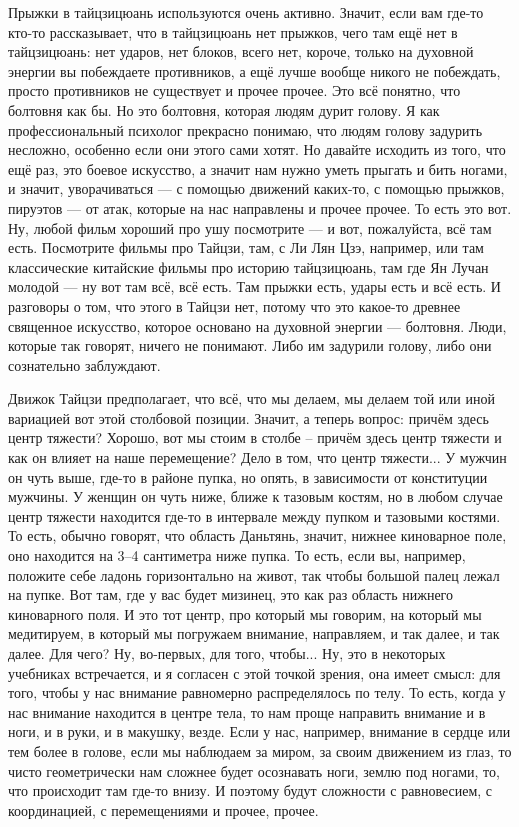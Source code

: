 Прыжки в тайцзицюань используются
очень активно. Значит, если вам где-то кто-то рассказывает, что в тайцзицюань нет прыжков, чего
там ещё нет в тайцзицюань: нет ударов, нет блоков, всего нет, короче, только на духовной
энергии вы побеждаете противников, а ещё лучше вообще никого не побеждать, просто противников
не существует и прочее прочее. Это всё понятно, что болтовня как бы. Но это болтовня, которая
людям дурит голову. Я как профессиональный психолог прекрасно понимаю, что людям голову
задурить несложно, особенно если они этого сами хотят. Но давайте исходить из того, что
ещё раз, это боевое искусство, а значит нам нужно уметь прыгать и бить ногами, и значит,
уворачиваться --- с помощью движений каких-то, с помощью прыжков, пируэтов --- от атак, которые на
нас направлены и прочее прочее. То есть это вот. Ну, любой фильм хороший про ушу посмотрите --- и
вот, пожалуйста, всё там есть. Посмотрите фильмы про Тайцзи, там, с Ли Лян Цзэ, например, или там
классические китайские фильмы про историю тайцзицюань, там где Ян
Лучан молодой --- ну вот там всё, всё есть. Там прыжки есть, удары есть и всё есть. И разговоры о
том, что этого в Тайцзи нет, потому что это какое-то древнее священное искусство, которое основано
на духовной энергии --- болтовня. Люди, которые так говорят, ничего не понимают. Либо им задурили
голову, либо они сознательно заблуждают.

Движок Тайцзи предполагает, что всё, что мы делаем, мы
делаем той или иной вариацией вот этой столбовой позиции. Значит, а теперь вопрос: причём здесь
центр тяжести? Хорошо, вот мы стоим в столбе -- причём здесь центр тяжести и как он влияет на
наше перемещение? Дело в том, что центр тяжести... У мужчин он чуть выше, где-то в районе пупка,
но опять, в зависимости от конституции мужчины. У женщин он чуть ниже, ближе к тазовым костям, но
в любом случае центр
тяжести находится где-то в интервале между пупком и тазовыми костями. То есть, обычно говорят,
что область Даньтянь, значит, нижнее киноварное поле, оно находится на 3--4 сантиметра ниже пупка.
То есть, если вы, например, положите себе ладонь горизонтально на живот, так чтобы большой палец
лежал на пупке. Вот там, где у вас будет мизинец, это как раз область нижнего киноварного поля.
И это
тот центр, про который мы говорим, на который мы медитируем, в который мы погружаем внимание,
направляем, и так далее, и так далее. Для чего? Ну,
во-первых, для того, чтобы... Ну, это в некоторых учебниках встречается, и я согласен с этой
точкой зрения, она имеет смысл: для того, чтобы у нас внимание равномерно распределялось по
телу. То есть, когда у нас внимание находится в центре тела, то нам проще направить внимание и
в ноги, и в руки, и в макушку, везде. Если у нас, например, внимание в сердце или тем более в
голове, если мы наблюдаем за миром, за своим движением из глаз, то чисто геометрически нам
сложнее будет осознавать ноги, землю под ногами, то, что происходит там где-то внизу. И поэтому
будут сложности с равновесием, с координацией, с перемещениями и прочее, прочее.

